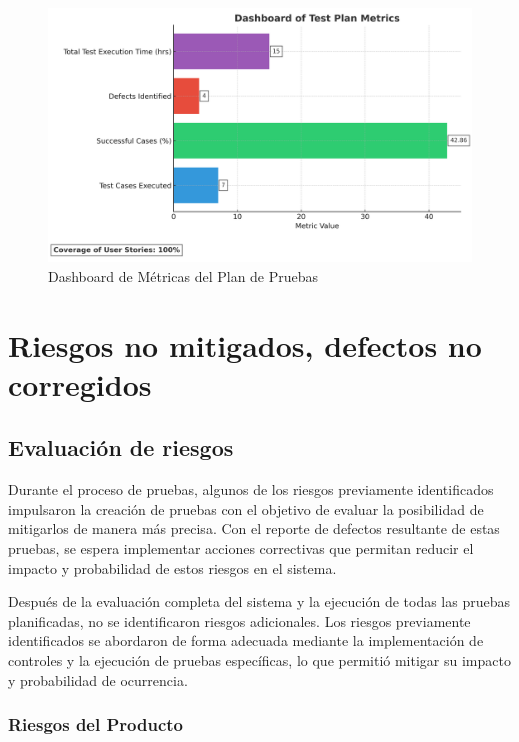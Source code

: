\documentclass[stu, 12pt, letterpaper, donotrepeattitle, floatsintext, natbib]{apa7}
\begin{document}
\begin{figure}[H]
    \label{fig:dashboard_metrica_pruebas}
    \centering
    \includegraphics[width=\textwidth]{../imgs/dashboard_test_metrics_white_bg.png}
    \caption{Dashboard de Métricas del Plan de Pruebas}
\end{figure}

\newpage
\section{\large Riesgos no mitigados, defectos no corregidos}

\subsection{Evaluación de riesgos}

\noindent Durante el proceso de pruebas, algunos de los riesgos previamente identificados impulsaron la creación de pruebas con el objetivo de evaluar la posibilidad de mitigarlos de manera más precisa. Con el reporte de defectos resultante de estas pruebas, se espera implementar acciones correctivas que permitan reducir el impacto y probabilidad de estos riesgos en el sistema.

\noindent Después de la evaluación completa del sistema y la ejecución de todas las pruebas planificadas, no se identificaron riesgos adicionales. Los riesgos previamente identificados se abordaron de forma adecuada mediante la implementación de controles y la ejecución de pruebas específicas, lo que permitió mitigar su impacto y probabilidad de ocurrencia.


\subsubsection{Riesgos del Producto}
\end{document}
